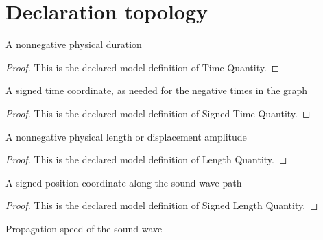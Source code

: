 \section{Declaration topology}
\begin{definition}
  \label{def:physics:phyx-mini-0309:phyxminiproblems-problemphyxmini0309-timequantity}
  A nonnegative physical duration
\end{definition}
\begin{proof}
  This is the declared model definition of Time Quantity.
\end{proof}
\begin{definition}
  \label{def:physics:phyx-mini-0309:phyxminiproblems-problemphyxmini0309-signedtimequantity}
  A signed time coordinate, as needed for the negative times in the graph
\end{definition}
\begin{proof}
  This is the declared model definition of Signed Time Quantity.
\end{proof}
\begin{definition}
  \label{def:physics:phyx-mini-0309:phyxminiproblems-problemphyxmini0309-lengthquantity}
  A nonnegative physical length or displacement amplitude
\end{definition}
\begin{proof}
  This is the declared model definition of Length Quantity.
\end{proof}
\begin{definition}
  \label{def:physics:phyx-mini-0309:phyxminiproblems-problemphyxmini0309-signedlengthquantity}
  A signed position coordinate along the sound-wave path
\end{definition}
\begin{proof}
  This is the declared model definition of Signed Length Quantity.
\end{proof}
\begin{definition}
  \label{def:physics:phyx-mini-0309:phyxminiproblems-problemphyxmini0309-speedquantity}
  Propagation speed of the sound wave
\end{definition}
